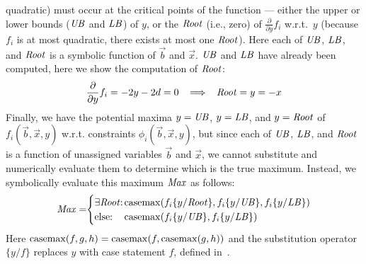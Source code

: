 quadratic) must occur at the critical points of the function --- 
either the upper or lower bounds ($\mathit{UB}$ and $\mathit{LB}$) of $y$, 
or the $\mathit{Root}$ (i.e., zero) of $\frac{\partial}{\partial y} f_i$ 
w.r.t.\ $y$ (because $f_i$ is at most quadratic, there exists 
at most one $\mathit{Root}$).  Here each of $\mathit{UB}$, $\mathit{LB}$, and $\mathit{Root}$
is a symbolic function of $\vec{b}$ and $\vec{x}$.  $\mathit{UB}$ and $\mathit{LB}$
have already been computed, here we show the computation of $\mathit{Root}$:
{\footnotesize 
\begin{align*}
\frac{\partial}{\partial y} f_i = - 2y - 2d = 0 \;\;\; \Longrightarrow \;\;\; \mathit{Root} = y = -x
\end{align*}}
Finally, we have the potential maxima $y = \mathit{UB}$, $y = \mathit{LB}$, and $y =
\mathit{Root}$ of $f_i(\vec{b},\vec{x},y)$ w.r.t. constraints
$\phi_i(\vec{b},\vec{x},y)$, but since each of
$\mathit{UB}$, $\mathit{LB}$, and $\mathit{Root}$ is a function of unassigned 
variables $\vec{b}$ and $\vec{x}$, we cannot substitute 
and numerically evaluate them
to determine which is the true maximum.  Instead, we 
symbolically evaluate this maximum $\mathit{Max}$ as follows: {\footnotesize
\begin{align*}
\Max =  \sq \begin{cases}
\mbox{$\exists \Root$}  \sq: \sq & \sqm \casemax( f_i \{ y / \Root \}, f_i \{ y / \UB \}, f_i \{ y / \LB \})\\
\mbox{else}  \sq:  \sq & \sqm \casemax( f_i \{ y / \UB \}, f_i \{ y / \LB \})
\end{cases}
\end{align*}}
Here $\mathrm{casemax}(f,g,h) = \mathrm{casemax}(f,\mathrm{casemax}(g,h))$ and the 
substitution operator $\{ y / f \}$ replaces $y$ with case statement $f$, 
defined in~\cite{sanner_uai11}.

